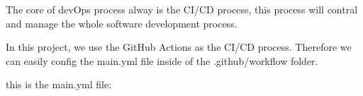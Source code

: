 The core of devOps process alway is the CI/CD process, this process will contral
and manage the whole software development process.

In this project, we use the GitHub Actions as the CI/CD process.
Therefore we can easily config the main.yml file inside of the .github/workflow folder.


this is  the main.yml file: